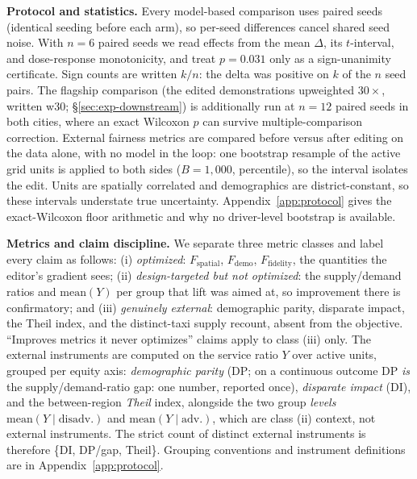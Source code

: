 \textbf{Protocol and statistics.} Every model-based comparison uses paired
seeds (identical seeding before each arm), so per-seed differences cancel
shared seed noise. With $n = 6$ paired seeds we read effects from the mean
$\Delta$, its $t$-interval, and dose-response monotonicity, and treat
$p = 0.031$ only as a sign-unanimity certificate. Sign counts are written
$k/n$: the delta was positive on $k$ of the $n$ seed pairs. The flagship
comparison (the edited demonstrations upweighted $30\times$, written w30;
\S\ref{sec:exp-downstream}) is additionally run at $n = 12$ paired seeds in
both cities, where an exact Wilcoxon $p$ can survive multiple-comparison
correction.
External fairness metrics are compared before versus after editing on the data alone,
with no model in the loop: one bootstrap resample of the active grid units
is applied to both sides ($B = 1{,}000$, percentile), so the interval
isolates the edit. Units are spatially correlated and demographics are
district-constant, so these intervals understate true uncertainty. 
Appendix~\ref{app:protocol} gives the exact-Wilcoxon floor arithmetic and
why no driver-level bootstrap is available.

\textbf{Metrics and claim discipline.} We separate three metric classes and
label every claim as follows: (i) \emph{optimized}: $F_{\mathrm{spatial}}$,
$F_{\mathrm{demo}}$, $F_{\mathrm{fidelity}}$, the quantities the editor's
gradient sees; (ii) \emph{design-targeted but not optimized}: the
supply\slash demand ratios and $\mathrm{mean}(Y)$ per group that lift was
aimed at, so
improvement there is confirmatory; and (iii) \emph{genuinely external}:
demographic parity, disparate impact, the Theil index, and the distinct-taxi
supply recount, absent from the objective.
``Improves metrics it never optimizes'' claims apply to class (iii) only. The
external instruments are computed on the service ratio $Y$ over active units,
grouped per equity axis: \emph{demographic parity} (DP; on a continuous outcome
DP \emph{is} the supply/demand-ratio gap: one number, reported once),
\emph{disparate impact} (DI), and the between-region \emph{Theil} index,
alongside the two group \emph{levels} $\mathrm{mean}(Y \mid \mathrm{disadv.})$
and $\mathrm{mean}(Y \mid \mathrm{adv.})$, which are class (ii) context, not
external instruments. The strict count of distinct external instruments is
therefore \{DI, DP/gap, Theil\}.
Grouping conventions and instrument definitions are in
Appendix~\ref{app:protocol}.

